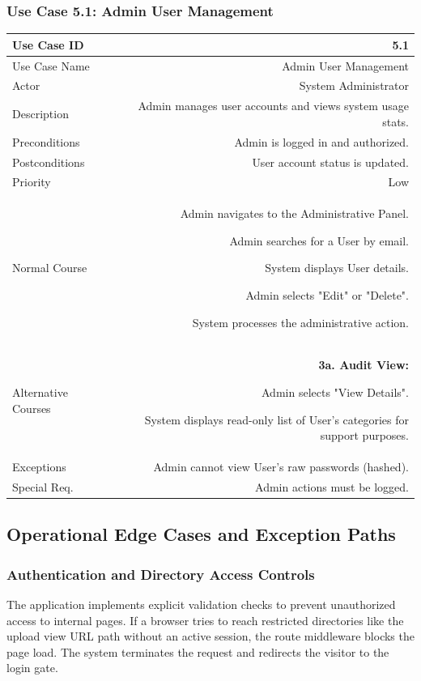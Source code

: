 \subsubsection{Use Case 5.1: Admin User Management}
\begin{tabularx}{\textwidth}{|L|R|}
	\hline
	Use Case ID & 5.1 \\ \hline
	Use Case Name & Admin User Management \\ \hline
	Actor & System Administrator \\ \hline
	Description & Admin manages user accounts and views system usage stats. \\ \hline
	Preconditions & Admin is logged in and authorized. \\ \hline
	Postconditions & User account status is updated. \\ \hline
	Priority & Low \\ \hline
	Normal Course & 
	\begin{normalsteps}
		\item Admin navigates to the Administrative Panel.
		\item Admin searches for a User by email.
		\item System displays User details.
		\item Admin selects "Edit" or "Delete".
		\item System processes the administrative action.
	\end{normalsteps} \\ \hline
	Alternative Courses & 
	\textbf{3a. Audit View:} 
	\begin{altsteps}
		\item Admin selects "View Details".
		\item System displays read-only list of User's categories for support purposes.
	\end{altsteps} \\ \hline
	Exceptions & Admin cannot view User's raw passwords (hashed). \\ \hline
	Special Req. & Admin actions must be logged. \\ \hline
\end{tabularx}

\subsection{Operational Edge Cases and Exception Paths}

\subsubsection{Authentication and Directory Access Controls}
The application implements explicit validation checks to prevent unauthorized access to internal pages. If a browser tries to reach restricted directories like the upload view URL path without an active session, the route middleware blocks the page load. The system terminates the request and redirects the visitor to the login gate.

